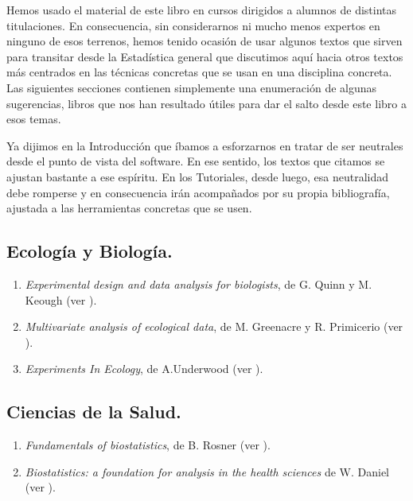 Hemos usado el material de este libro en cursos dirigidos a alumnos de distintas titulaciones.  En consecuencia, sin considerarnos ni mucho menos expertos en ninguno de esos terrenos, hemos tenido ocasión de usar algunos textos que sirven para transitar desde la Estadística general que discutimos aquí hacia otros textos más centrados en las técnicas concretas que se usan en una disciplina concreta. Las siguientes secciones contienen simplemente una enumeración de algunas sugerencias, libros que nos han resultado útiles para dar el salto desde este libro a esos temas.

Ya dijimos en la Introducción que íbamos a esforzarnos en tratar de ser neutrales desde el punto de vista del software. En ese sentido, los textos que citamos se ajustan bastante a ese espíritu. En los Tutoriales, desde luego, esa neutralidad debe romperse y en consecuencia irán acompañados por su propia bibliografía, ajustada a las herramientas concretas que se usen.

\subsection{Ecología y Biología.}

\begin{enumerate}
  \item {\em Experimental design and data analysis for biologists}, de G. Quinn y M. Keough (ver \cite{quinn2002experimental}).

  \item {\em Multivariate analysis of ecological data}, de M. Greenacre y R. Primicerio  (ver \cite{greenacre2014multivariate}).

  \item {\em Experiments In Ecology}, de A.Underwood (ver \cite{underwood1997experiments}).
\end{enumerate}


\subsection{Ciencias de la Salud.}

\begin{enumerate}
  \item {\em Fundamentals of biostatistics}, de B. Rosner (ver \cite{rosner2011fundamentals}).

  \item {\em Biostatistics: a foundation for analysis in the health sciences} de W. Daniel (ver \cite{daniel1987biostatistics}).


\end{enumerate}


